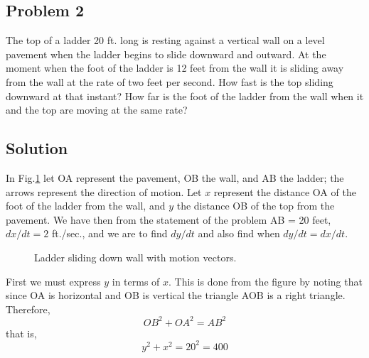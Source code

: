 \subsection*{Problem 2}
The top of a ladder 20 ft. long is resting against a vertical wall on a level pavement when the ladder begins to slide downward and outward. At the moment when the foot of the ladder is 12 feet from the wall it is sliding away from the wall at the rate of two feet per second. How fast is the top sliding downward at that instant? How far is the foot of the ladder from the wall when it and the top are moving at the same rate?

\subsection*{Solution}
In Fig.\ref{fig:ladder} let OA represent the pavement, OB the wall, and AB the ladder; the arrows represent the direction of motion. Let $x$ represent the distance OA of the foot of the ladder from the wall, and $y$ the distance OB of the top from the pavement. We have then from the statement of the problem AB = 20 feet, $dx/dt = 2$ ft./sec., and we are to find $dy/dt$ and also find when $dy/dt = dx/dt$.

\begin{figure}[h]
\centering
{}
\caption{Ladder sliding down wall with motion vectors.}
\label{fig:ladder}
\end{figure}

First we must express $y$ in terms of $x$. This is done from the figure by noting that since OA is horizontal and OB is vertical the triangle AOB is a right triangle. Therefore,
\[OB^2 + OA^2 = AB^2\]
that is,
\[y^2 + x^2 = 20^2 = 400\]

